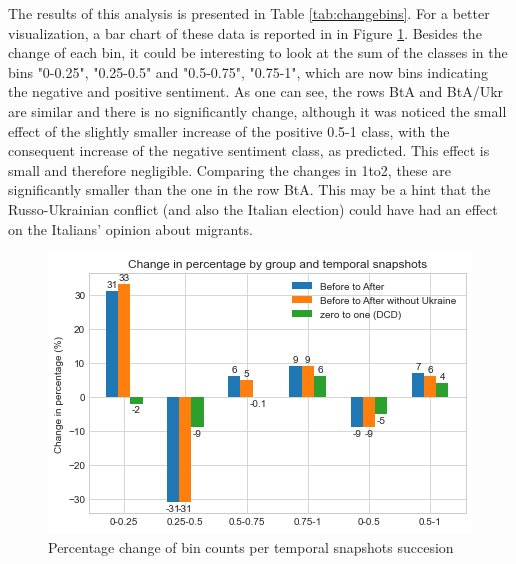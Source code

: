 \documentclass[sigchi]{acmart}
\begin{document}
\begin{table}[h]
    \centering
        \caption{Percentual change of bin counts.\\BtA indicates the change of user label from before to after the 2022 Russo-Ukrainian Conflict; BtA/Ukr idem but having removed the tweets containing the substring "ucr"; 1to2 indicates the change between the first and second temporal snapshot created in the dynamic community discovery task.}
    \label{tab:changebins}
\end{table}


The results of this analysis is presented in Table \ref{tab:changebins}. For a better visualization, a bar chart of these data is reported in in Figure \ref{fig:percbar}.
Besides the change of each bin, it could be interesting to look at the sum of the classes in the bins "0-0.25", "0.25-0.5" and "0.5-0.75", "0.75-1", which are now bins indicating the negative and positive sentiment. As one can see, the rows BtA and BtA/Ukr are similar and there is no significantly change, although it was noticed the small effect of the slightly smaller increase of the positive 0.5-1 class, with the consequent increase of the negative sentiment class, as predicted. This effect is small and therefore negligible. 
Comparing the changes in 1to2, these are significantly smaller than the one in the row BtA. This may be a hint that the Russo-Ukrainian conflict (and also the Italian election) could have had an effect on the Italians' opinion about migrants.

\begin{figure}[h]
    \centering
    \includegraphics[width=0.88\columnwidth]{report/img/change_percentage.png}
    \caption{Percentage change of bin counts per temporal snapshots succesion}
    \label{fig:percbar}
\end{figure}
\end{document}
